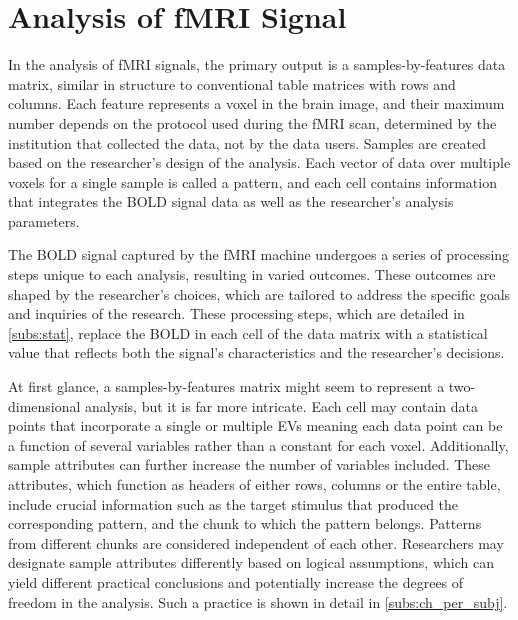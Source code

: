 \section{Analysis of fMRI Signal} %

In the analysis of \gls{fMRI} signals, the primary output is a samples-by-features data matrix, similar in structure to conventional table matrices with rows and columns. Each feature represents a voxel in the brain image, and their maximum number depends on the protocol used during the \gls{fMRI} scan, determined by the institution that collected the data, not by the data users. Samples are created based on the researcher's design of the analysis. Each vector of data over multiple voxels for a single sample is called a pattern, and each cell contains information that integrates the \gls{BOLD} signal data as well as the researcher's analysis parameters.

The \gls{BOLD} signal captured by the \gls{fMRI} machine undergoes a series of processing steps unique to each analysis, resulting in varied outcomes. These outcomes are shaped by the researcher's choices, which are tailored to address the specific goals and inquiries of the research. These processing steps, which are detailed in \autoref{subs:stat}, replace the \gls{BOLD} in each cell of the data matrix with a statistical value that reflects both the signal's characteristics and the researcher's decisions.

At first glance, a samples-by-features matrix might seem to represent a two-dimensional analysis, but it is far more intricate. Each cell may contain data points that incorporate a single or multiple \gls{EV}s meaning each data point can be a function of several variables rather than a constant for each voxel. Additionally, sample attributes can further increase the number of variables included. These attributes, which function as headers of either rows, columns or the entire table, include crucial information such as the target stimulus that produced the corresponding pattern, and the chunk to which the pattern belongs. Patterns from different chunks are considered independent of each other. Researchers may designate sample attributes differently based on logical assumptions, which can yield different practical conclusions and potentially increase the degrees of freedom in the analysis. Such a practice is shown in detail in \autoref{subs:ch_per_subj}. 

